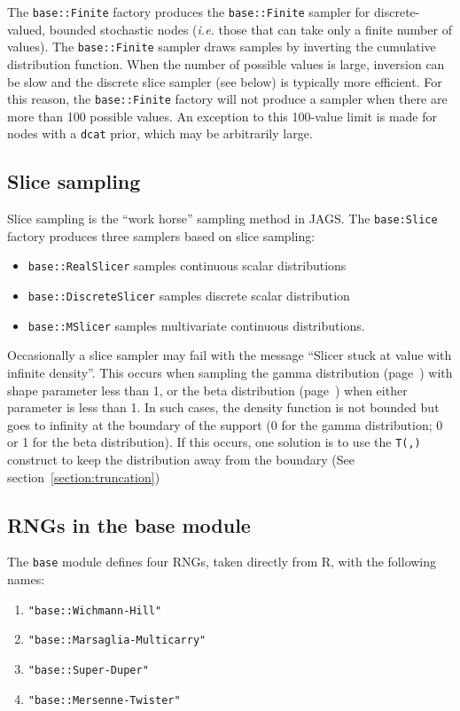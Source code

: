 \documentclass[11pt, a4paper, titlepage]{report}
\newcommand{\JAGS}{\textsf{JAGS}}
\newcommand{\R}{\textsf{R}}
\begin{document}
The \texttt{base::Finite} factory produces the \texttt{base::Finite}
sampler for discrete-valued, bounded stochastic nodes ({\em i.e.}
those that can take only a finite number of values). The
\texttt{base::Finite} sampler draws samples by inverting the
cumulative distribution function. When the number of possible values
is large, inversion can be slow and the discrete slice sampler (see
below) is typically more efficient. For this reason, the
\texttt{base::Finite} factory will not produce a sampler when there
are more than 100 possible values. An exception to this 100-value
limit is made for nodes with a \texttt{dcat} prior, which may be
arbitrarily large.

\subsection{Slice sampling}

Slice sampling \citep{Neal2003} is the ``work horse'' sampling method
in \JAGS. The \texttt{base:Slice} factory produces three samplers
based on slice sampling:
\begin{itemize}
\item \texttt{base::RealSlicer} samples continuous scalar
  distributions
\item \texttt{base::DiscreteSlicer} samples discrete scalar
  distribution
\item \texttt{base::MSlicer} samples multivariate continuous
  distributions.
\end{itemize}

Occasionally a slice sampler may fail with the message ``Slicer stuck
at value with infinite density''. This occurs when sampling the gamma
distribution (page~\pageref{bugs:dgamma}) with shape parameter less
than 1, or the beta distribution (page~\pageref{bugs:dbeta}) when
either parameter is less than 1.  In such cases, the density function
is not bounded but goes to infinity at the boundary of the support (0
for the gamma distribution; 0 or 1 for the beta distribution). If this
occurs, one solution is to use the \texttt{T(,)} construct to keep the
distribution away from the boundary (See section~\ref{section:truncation})

\subsection{RNGs in the base module}

The \texttt{base} module defines four RNGs, taken directly from \R,
with the following names:
\begin{enumerate}
\item \verb+"base::Wichmann-Hill"+
\item \verb+"base::Marsaglia-Multicarry"+
\item \verb+"base::Super-Duper"+
\item \verb+"base::Mersenne-Twister"+
\end{enumerate}
\end{document}
